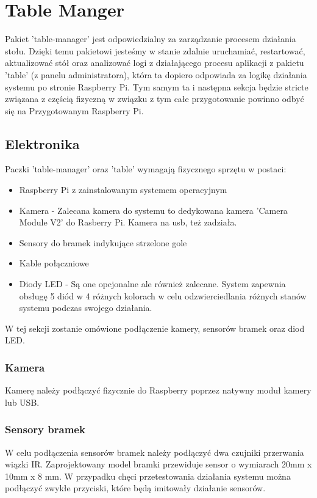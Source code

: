 \section{Table Manger}
Pakiet 'table-manager' jest odpowiedzialny za zarządzanie procesem działania stołu. Dzięki temu pakietowi jesteśmy w stanie zdalnie uruchamiać, restartować, aktualizować stół oraz analizować logi z działającego procesu aplikacji z pakietu 'table' (z panelu administratora), która ta dopiero odpowiada za logikę działania systemu po stronie Raspberry Pi. Tym samym ta i następna sekcja będzie stricte związana z częścią fizyczną w związku z tym całe przygotowanie powinno odbyć się na Przygotowanym Raspberry Pi.

\subsection{Elektronika}

Paczki 'table-manager' oraz 'table' wymagają fizycznego sprzętu w postaci:

\begin{itemize}
	\item Raspberry Pi z zainstalowanym systemem operacyjnym
	\item Kamera - Zalecana kamera do systemu to dedykowana kamera 'Camera Module V2' do Rasberry Pi. Kamera na usb, też zadziała.
	\item Sensory do bramek indykujące strzelone gole
	\item Kable połączniowe
	\item Diody LED - Są one opcjonalne ale również zalecane. System zapewnia obsługę 5 diód w 4 różnych kolorach w celu odzwierciedlania różnych stanów systemu podczas swojego działania.
\end{itemize}

W tej sekcji zostanie omówione podłączenie kamery, sensorów bramek oraz diod LED.

\subsubsection{Kamera}

Kamerę należy podłączyć fizycznie do Raspberry poprzez natywny moduł kamery lub USB.

\subsubsection{Sensory bramek}

W celu podłączenia sensorów bramek należy podłączyć dwa czujniki przerwania wiązki IR. Zaprojektowany model bramki przewiduje sensor o wymiarach 20mm x 10mm x 8 mm. W przypadku chęci przetestowania działania systemu można podłączyć zwykłe przyciski, które będą imitowały działanie sensorów.

